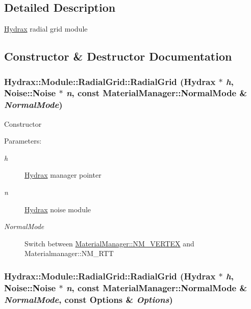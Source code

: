 \subsection{Detailed Description}
\hyperlink{class_hydrax_1_1_hydrax}{Hydrax} radial grid module 

\subsection{Constructor \& Destructor Documentation}
\hypertarget{class_hydrax_1_1_module_1_1_radial_grid_5633f577c51302d5175f4feddfa80d19}{
\subsubsection[{RadialGrid}]{\setlength{\rightskip}{0pt plus 5cm}Hydrax::Module::RadialGrid::RadialGrid ({\bf Hydrax} $\ast$ {\em h}, \/  {\bf Noise::Noise} $\ast$ {\em n}, \/  const {\bf MaterialManager::NormalMode} \& {\em NormalMode})}}
\label{class_hydrax_1_1_module_1_1_radial_grid_5633f577c51302d5175f4feddfa80d19}


Constructor \begin{Desc}
\item[Parameters:]
\begin{description}
\item[{\em h}]\hyperlink{class_hydrax_1_1_hydrax}{Hydrax} manager pointer \item[{\em n}]\hyperlink{class_hydrax_1_1_hydrax}{Hydrax} noise module \item[{\em NormalMode}]Switch between \hyperlink{class_hydrax_1_1_material_manager_aa14689cd1c259f48954dfecda9b296ffe4d6257f673cf503a9905fb2576288f}{MaterialManager::NM\_\-VERTEX} and Materialmanager::NM\_\-RTT \end{description}
\end{Desc}
\hypertarget{class_hydrax_1_1_module_1_1_radial_grid_bc52ff8727a537d5303fabc1179fa45f}{
\subsubsection[{RadialGrid}]{\setlength{\rightskip}{0pt plus 5cm}Hydrax::Module::RadialGrid::RadialGrid ({\bf Hydrax} $\ast$ {\em h}, \/  {\bf Noise::Noise} $\ast$ {\em n}, \/  const {\bf MaterialManager::NormalMode} \& {\em NormalMode}, \/  const {\bf Options} \& {\em Options})}}
\label{class_hydrax_1_1_module_1_1_radial_grid_bc52ff8727a537d5303fabc1179fa45f}


